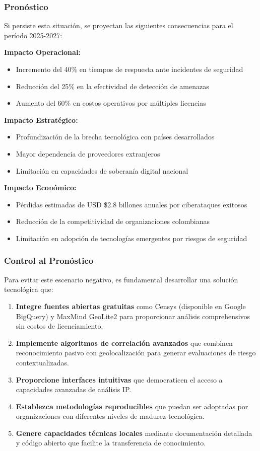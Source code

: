 \subsubsection{Pronóstico}
Si persiste esta situación, se proyectan las siguientes consecuencias para el período 2025-2027:

\textbf{Impacto Operacional:}
\begin{itemize}
    \item Incremento del 40\% en tiempos de respuesta ante incidentes de seguridad
    \item Reducción del 25\% en la efectividad de detección de amenazas
    \item Aumento del 60\% en costos operativos por múltiples licencias
\end{itemize}

\textbf{Impacto Estratégico:}
\begin{itemize}
    \item Profundización de la brecha tecnológica con países desarrollados
    \item Mayor dependencia de proveedores extranjeros
    \item Limitación en capacidades de soberanía digital nacional
\end{itemize}

\textbf{Impacto Económico:}
\begin{itemize}
    \item Pérdidas estimadas de USD \$2.8 billones anuales por ciberataques exitosos
    \item Reducción de la competitividad de organizaciones colombianas
    \item Limitación en adopción de tecnologías emergentes por riesgos de seguridad
\end{itemize}

\subsubsection{Control al Pronóstico}
Para evitar este escenario negativo, es fundamental desarrollar una solución tecnológica que:

\begin{enumerate}
    \item \textbf{Integre fuentes abiertas gratuitas} como Censys (disponible en Google BigQuery) y MaxMind GeoLite2 para proporcionar análisis comprehensivos sin costos de licenciamiento.
    \item \textbf{Implemente algoritmos de correlación avanzados} que combinen reconocimiento pasivo con geolocalización para generar evaluaciones de riesgo contextualizadas.
    \item \textbf{Proporcione interfaces intuitivas} que democraticen el acceso a capacidades avanzadas de análisis IP.
    \item \textbf{Establezca metodologías reproducibles} que puedan ser adoptadas por organizaciones con diferentes niveles de madurez tecnológica.
    \item \textbf{Genere capacidades técnicas locales} mediante documentación detallada y código abierto que facilite la transferencia de conocimiento.
\end{enumerate}

